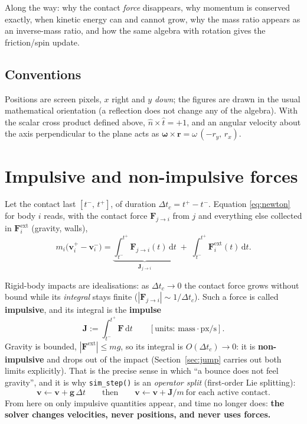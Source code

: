 \documentclass[a4paper,11pt]{article}
\newcommand{\vV}{\bm{v}}
\newcommand{\Jimp}{\bm{J}}
\newcommand{\hh}{\hat{n}}
\newcommand{\ttt}{\hat{t}}
\newcommand{\rr}{\bm{r}}          %
\newcommand{\dtc}{\Delta t_c}     %
\newcommand{\dd}{\mathrm{d}}
\begin{document}
Along the way: why the contact \emph{force} disappears, why momentum is
conserved exactly, when kinetic energy can and cannot grow, why the mass ratio
appears as an inverse-mass ratio, and how the same algebra with rotation gives
the friction/spin update.

\subsection{Conventions}
Positions are screen pixels, $x$ right and $y$ \emph{down}; the figures are
drawn in the usual mathematical orientation (a reflection does not change any
of the algebra). With the scalar cross product defined above,
$\hh\times\ttt=+1$, and an angular velocity about the axis perpendicular to the
plane acts as $\bm\omega\times\rr=\omega\,(-r_y,\,r_x)$.

\section{Impulsive and non-impulsive forces}

Let the contact last $[t^-,\,t^+]$, of duration $\dtc=t^+-t^-$.
Equation \eqref{eq:newton} for body $i$ reads, with the contact force
$\bm F_{j\to i}$ from $j$ and everything else collected in $\bm F_i^{\text{ext}}$
(gravity, walls),
\begin{equation}
  m_i\bigl(\vV_i^+-\vV_i^-\bigr)
  =\underbrace{\int_{t^-}^{t^+}\bm F_{j\to i}(t)\,\dd t}_{\textstyle \Jimp_{j\to i}}
  \;+\;\int_{t^-}^{t^+}\bm F_i^{\text{ext}}(t)\,\dd t .
  \label{eq:integrated}
\end{equation}

Rigid-body impacts are idealisations: as $\dtc\to0$ the contact force grows
without bound while its \emph{integral} stays finite
($|\bm F_{j\to i}|\sim 1/\dtc$). Such a force is called \textbf{impulsive}, and
its integral is the \textbf{impulse}
\begin{equation}
  \Jimp:=\int_{t^-}^{t^+}\bm F\,\dd t
  \qquad[\text{units: mass}\cdot\text{px/s}].
  \label{eq:impulse}
\end{equation}
Gravity is bounded, $|\bm F^{\text{ext}}|\le m g$, so its integral is
$O(\dtc)\to 0$: it is \textbf{non-impulsive} and drops out of the impact
(Section~\ref{sec:jump} carries out both limits explicitly).
That is the precise sense in which ``a bounce does not feel gravity'', and it is
why \texttt{sim\_step()} is an \emph{operator split} (first-order Lie
splitting):
\[
  \vV \leftarrow \vV+\bm g\,\Delta t
  \qquad\text{then}\qquad
  \vV \leftarrow \vV+\Jimp/m \ \text{for each active contact}.
\]
From here on only impulsive quantities appear, and time no longer does:
\textbf{the solver changes velocities, never positions, and never uses forces.}
\end{document}
